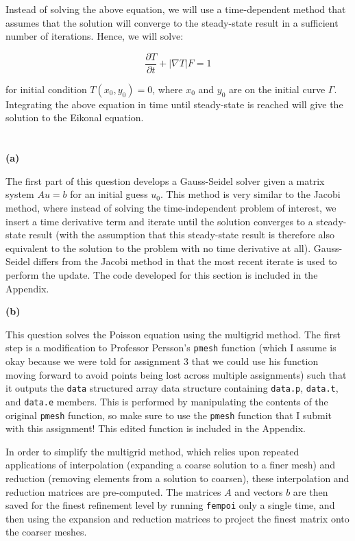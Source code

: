 \documentclass[10pt]{article}
\newcommand{\beq}{\begin{equation}}
\newcommand{\eeq}{\end{equation}}
\begin{document}
Instead of solving the above equation, we will use a time-dependent method that assumes that the solution will converge to the steady-state result in a sufficient number of iterations. Hence, we will solve:

\beq
\frac{\partial T}{\partial t}+|\nabla T|F=1
\eeq

for initial condition \(T(x_0, y_0)=0\), where \(x_0\) and \(y_0\) are on the initial curve \(\Gamma\). Integrating the above equation in time until steady-state is reached will give the solution to the Eikonal equation. 



\section{}

\textbf{(a)}

The first part of this question develops a Gauss-Seidel solver given a matrix system \(Au=b\) for an initial guess \(u_0\). This method is very similar to the Jacobi method, where instead of solving the time-independent problem of interest, we insert a time derivative term and iterate until the solution converges to a steady-state result (with the assumption that this steady-state result is therefore also equivalent to the solution to the problem with no time derivative at all). Gauss-Seidel differs from the Jacobi method in that the most recent iterate is used to perform the update. The code developed for this section is included in the Appendix.

\textbf{(b)}

This question solves the Poisson equation using the multigrid method. The first step is a modification to Professor Persson's {\tt pmesh} function (which I assume is okay because we were told for assignment 3 that we could use his function moving forward to avoid points being lost across multiple assignments) such that it outputs the {\tt data} structured array data structure containing {\tt data.p}, {\tt data.t}, and {\tt data.e} members. This is performed by manipulating the contents of the original {\tt pmesh} function, so make sure to use the {\tt pmesh} function that I submit with this assignment! This edited function is included in the Appendix.

In order to simplify the multigrid method, which relies upon repeated applications of interpolation (expanding a coarse solution to a finer mesh) and reduction (removing elements from a solution to coarsen), these interpolation and reduction matrices are pre-computed. The matrices \(A\) and vectors \(b\) are then saved for the finest refinement level by running {\tt fempoi} only a single time, and then using the expansion and reduction matrices to project the finest matrix onto the coarser meshes.
\end{document}
